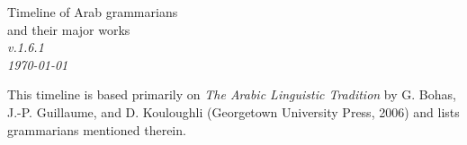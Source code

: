 \documentclass[
	a4paper %
	,landscape]{article}
\begin{document}
\thispagestyle{empty}

\begin{minipage}[t]{.4\textwidth} %
{\LARGE Timeline of Arab grammarians\\and their major works}\\ %
	[\medskipamount] 
\textit{%
	v.1.6.1\\ %
	\today %
	}
\end{minipage}
\hfill
\begin{minipage}[t]{7cm} %
  \setlength{\parfillskip}{0pt}
This timeline is based primarily on \textit{The Arabic Linguistic Tradition} by G. Bohas, \mbox{J.-P.} Guillaume, and D. Kouloughli (Georgetown University Press, 2006) and lists grammarians mentioned therein. %
\end{minipage}


\vfill
\end{document}
